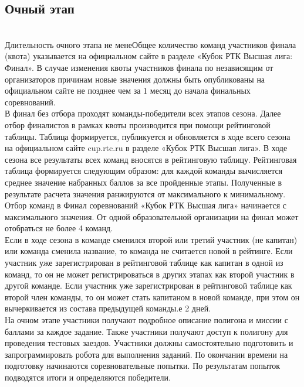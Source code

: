 \documentclass[12pt]{article}
\begin{document}
\subsection{Очный этап} \hspace*{1cm}
\\\hspace*{1cm}Длительность очного этапа не менеОбщее количество команд участников финала (квота) указывается на официальном сайте в разделе «Кубок РТК Высшая лига: Финал». В случае изменения квоты участников финала по независящим от организаторов причинам новые значения должны быть опубликованы на официальном сайте не позднее чем за 1 месяц до начала финальных соревнований.
\\\hspace*{1cm}В финал без отбора проходят команды-победители всех этапов сезона. Далее отбор финалистов в рамках квоты производится при помощи рейтинговой таблицы. Таблица формируется, публикуется и обновляется в ходе всего сезона на официальном сайте cup.rtc.ru в разделе «Кубок РТК Высшая лига». В ходе сезона все результаты всех команд вносятся в рейтинговую таблицу. Рейтинговая таблица формируется следующим образом: для каждой команды вычисляется среднее значение набранных баллов за все пройденные этапы. Полученные в результате расчета значения ранжируются от максимального к минимальному. Отбор команд в Финал соревнований «Кубок РТК Высшая лига» начинается с максимального значения.
От одной образовательной организации на финал может отобраться не более 
4 команд.
\\\hspace*{1cm}Если в ходе сезона в команде сменился второй или третий участник (не капитан) или команда сменила название, то команда не считается новой в рейтинге. Если участник уже зарегистрирован в рейтинговой таблице как капитан в одной из команд, то он не может регистрироваться в других этапах как второй участник в другой команде. Если участник уже зарегистрирован в рейтинговой таблице как второй член команды, то он может стать капитаном в новой команде, при этом он вычеркивается из состава предыдущей команды.е 2 дней.
\\\hspace*{1cm}На очном этапе участники получают подробное описание полигона и миссии с баллами за каждое задание. Также участники получают доступ к полигону для проведения тестовых заездов.
Участники должны самостоятельно подготовить и запрограммировать робота для выполнения заданий. По окончании времени на подготовку начинаются соревновательные попытки. По результатам попыток подводятся итоги и определяются победители.
\end{document}
